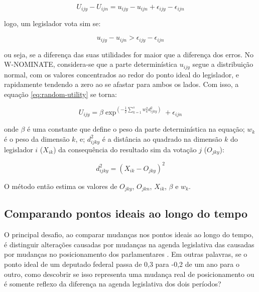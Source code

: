 \documentclass[a4paper,titlepage]{ppgi}\usepackage[]{graphicx}\usepackage[]{color}
\begin{document}
\begin{equation}
U_{ijy} - U_{ijn} = u_{ijy} - u_{ijn} + \epsilon_{ijy} - \epsilon_{ijn}
\end{equation}

logo, um legislador vota sim se:

\begin{equation}
u_{ijy} - u_{ijn} > \epsilon_{ijy} - \epsilon_{ijn}
\end{equation}

ou seja, se a diferença das suas utilidades for maior que a diferença dos
erros. No W-NOMINATE, considera-se que a parte determinística $u_{ijy}$ segue a
distribuição normal, com os valores concentrados ao redor do ponto ideal do
legislador, e rapidamente tendendo a zero ao se afastar para ambos os lados.
Com isso, a equação \ref{eq:random-utility} se torna:

\begin{equation}
  U_{ijy} = \beta \exp^{\left( - \frac{1}{2} \sum\limits_{k=1}^s w_k^2 d_{ijky}^2 \right)} + \epsilon_{ijn}
\end{equation}

onde $\beta$ é uma constante que define o peso da parte determinística na
equação; $w_k$ é o peso da dimensão $k$, e; $d_{ijky}^2$ é a distância ao
quadrado na dimensão $k$ do legislador $i$ ($X_{ik}$) da consequência do
resultado sim da votação $j$ ($O_{jky}$):

\begin{equation}
d_{ijky}^2 = \left(X_{ik} - O_{jky}\right)^2
\end{equation}

O método então estima os valores de $O_{jky}$, $O_{jkn}$, $X_{ik}$, $\beta$ e
$w_k$.


\subsection{Comparando pontos ideais ao longo do tempo}
\label{cap:fundamentacao:comparando-pontos-ideais-no-tempo}

O principal desafio, ao comparar mudanças nos pontos ideais ao longo do tempo,
é distinguir alterações causadas por mudanças na agenda legislativa das
causadas por mudanças no posicionamento dos parlamentares \cite{Bailey2007}. Em
outras palavras, se o ponto ideal de um deputado federal passa de 0,3 para -0,2
de um ano para o outro, como descobrir se isso representa uma mudança real de
posicionamento ou é somente reflexo da diferença na agenda legislativa dos dois
períodos?
\end{document}
